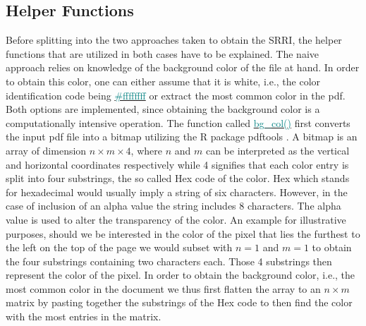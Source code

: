 \documentclass[aodsor,preprint]{imsart}
\numberwithin{equation}{section}
\theoremstyle{plain}
\begin{document}
\subsection{Helper Functions}
Before splitting into the two approaches taken to obtain the SRRI, the helper functions that are utilized in both cases have to be explained. The naive approach relies on knowledge of the background color of the file at hand. In order to obtain this color, one can either assume that it is white, i.e., the color identification code being \href{https://www.color-hex.com/color/ffffff}{\textcolor{teal}{\#ffffffff}} or extract the most common color in the pdf. Both options are implemented, since obtaining the background color is a computationally intensive operation. The function called  \href{https://github.com/Base-R-Best-R/KID/blob/main/Code/Package/KIDs/R/bg_col.R}{\textcolor{teal}{bg\_col()}} first converts the input pdf file into a bitmap utilizing the R package pdftools \citep{pdftools}. A bitmap is an array of dimension $n \times m \times 4$, where $n$ and $m$ can be interpreted as the vertical and horizontal coordinates respectively while 4 signifies that each color entry is split into four substrings, the so called Hex code of the color. Hex which stands for hexadecimal would usually imply a string of six characters. However, in the case of inclusion of an alpha value the string includes 8 characters. The alpha value is used to alter the transparency of the color. An example for illustrative purposes, should we be interested in the color of the pixel that lies the furthest to the left on the top of the page we would subset with $n = 1$ and $m = 1$ to obtain the four substrings containing two characters each. Those 4 substrings then represent the color of the pixel. In order to obtain the background color, i.e., the most common color in the document we thus first flatten the array to an $n\times m$ matrix by pasting together the substrings of the Hex code to then find the color with the most entries in the matrix.\\
\end{document}
